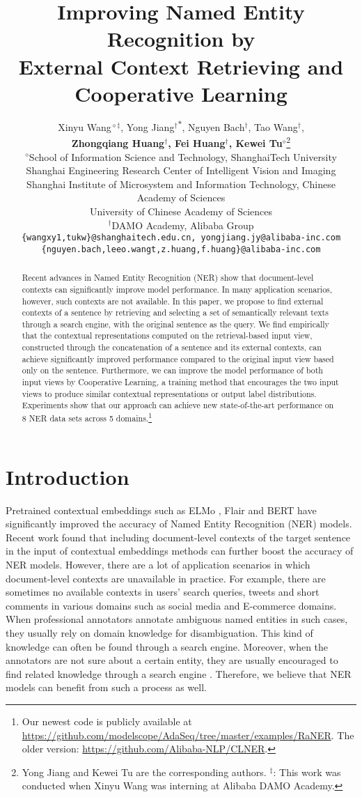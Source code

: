 \documentclass[11pt,a4paper]{article}
\title{Improving Named Entity Recognition by \\ External Context Retrieving and Cooperative Learning}
\author{Xinyu Wang$^{\diamond\ddagger}$, Yong Jiang$^{\dagger}$\textsuperscript{$\ast$}, Nguyen Bach$^{\dagger}$, Tao Wang$^{\dagger}$,\\
\textbf{Zhongqiang Huang$^{\dagger}$, Fei Huang$^{\dagger}$,  Kewei Tu$^{\diamond}$}\thanks{\hspace{1mm} Yong Jiang and Kewei Tu are the corresponding authors. $^{\ddagger}$: This work was conducted when Xinyu Wang was interning at Alibaba DAMO Academy. } \\
 $^\diamond$School of Information Science and Technology, ShanghaiTech University \\
 Shanghai Engineering Research Center of Intelligent Vision and Imaging \\
 Shanghai Institute of Microsystem and Information Technology, Chinese Academy of Sciences \\
 University of Chinese Academy of Sciences \\
 $^\dagger$DAMO Academy, Alibaba Group \\
  {\tt \{wangxy1,tukw\}@shanghaitech.edu.cn, yongjiang.jy@alibaba-inc.com} \\
  {\tt \{nguyen.bach,leeo.wangt,z.huang,f.huang\}@alibaba-inc.com} \\
}
\date{}
\begin{document}
\maketitle
\begin{abstract}


Recent advances in Named Entity Recognition (NER) show that document-level contexts can significantly improve model performance. In many application scenarios, however, such contexts are not available. In this paper, we propose to find external contexts of a sentence by retrieving and selecting a set of semantically relevant texts through a search engine, with the original sentence as the query. We find empirically that the contextual representations computed on the retrieval-based input view, constructed through the concatenation of a sentence and its external contexts, can achieve significantly improved performance compared to the original input view based only on the sentence. Furthermore, we can improve the model performance of both input views by Cooperative Learning, a training method that encourages the two input views to produce similar contextual representations or output label distributions. Experiments show that our approach can achieve new state-of-the-art performance on 8 NER data sets across 5 domains.\footnote{Our newest code is publicly available at \url{https://github.com/modelscope/AdaSeq/tree/master/examples/RaNER}. The older version: \url{https://github.com/Alibaba-NLP/CLNER}.}

\end{abstract}

\section{Introduction}
Pretrained contextual embeddings such as ELMo \citep{peters-etal-2018-deep}, Flair \citep{akbik-etal-2018-contextual} and BERT \citep{devlin-etal-2019-bert} have significantly improved the accuracy of Named Entity Recognition (NER) models. Recent work \citep{devlin-etal-2019-bert,yu-etal-2020-named,yamada-etal-2020-luke} found that including document-level contexts of the target sentence in the input of contextual embeddings methods can further boost the accuracy of NER models. 
However, there are a lot of application scenarios in which document-level contexts are unavailable in practice. For example, there are sometimes no available contexts in users' search queries, tweets and short comments in various domains such as social media and E-commerce domains. When professional annotators annotate ambiguous named entities in such cases, they usually rely on domain knowledge for disambiguation. This kind of knowledge can often be found through a search engine. Moreover, when the annotators are not sure about a certain entity, they are usually encouraged to find related knowledge through a search engine \citep{wang-etal-2019-crossweigh}. Therefore, we believe that NER models can benefit from such a process as well. 
\end{document}
